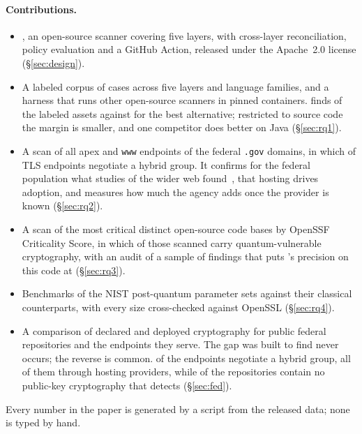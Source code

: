 \paragraph{Contributions.}
\begin{itemize}
\item \tool{}, an open-source scanner covering five layers, with cross-layer
  reconciliation, policy evaluation and a GitHub Action, released under the
  Apache~2.0 license (\S\ref{sec:design}).
\item A labeled corpus of  cases across five layers and
   language families, and a harness that runs
   other open-source scanners in pinned containers.
  \tool{} finds  of the labeled assets against
   for the best alternative; restricted to source
  code the margin is smaller, and one competitor does better on Java
  (\S\ref{sec:rq1}).
\item A scan of all  apex and \texttt{www} endpoints of
  the  federal \texttt{.gov} domains, in which
   of TLS endpoints negotiate a hybrid group. It confirms
  for the federal population what studies of the wider web
  found~\cite{wickramasinghe2026,loizou2026}, that hosting drives adoption, and
  measures how much the agency adds once the provider is known
  (\S\ref{sec:rq2}).
\item A scan of the  most critical distinct open-source
  code bases by OpenSSF Criticality Score, in which  of
  those scanned carry quantum-vulnerable cryptography, with an audit of a
  sample of findings that puts \tool{}'s precision on this code at 
  (\S\ref{sec:rq3}).
\item Benchmarks of the NIST post-quantum parameter sets against their
  classical counterparts, with every size cross-checked against OpenSSL
  (\S\ref{sec:rq4}).
\item A comparison of declared and deployed cryptography for
   public federal repositories and the endpoints they serve.
  The gap \tool{} was built to find never occurs; the reverse is common.
   of the endpoints negotiate a hybrid group,
  all of them through  hosting providers, while
   of the repositories contain no public-key
  cryptography that \tool{} detects (\S\ref{sec:fed}).
\end{itemize}
Every number in the paper is generated by a script from the released data;
none is typed by hand.
